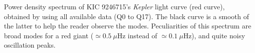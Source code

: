 \label{fig:seismo} Power density spectrum of KIC 9246715's \textit{Kepler} light curve (red curve), obtained by using all available data (Q0 to Q17). The black curve is a smooth of the latter to help the reader observe the modes. Peculiarities of this spectrum are broad modes for a red giant ($\simeq0.5\ \mu$Hz instead of $\simeq0.1\ \mu$Hz), and quite noisy oscillation peaks. 
  
  
  
  